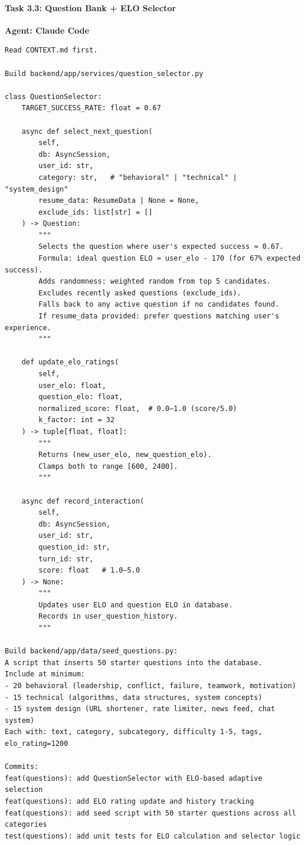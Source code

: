 \documentclass[
  11pt,
]{article}
\begin{document}
\hypertarget{task-3.3-question-bank-elo-selector}{%
\paragraph{Task 3.3: Question Bank + ELO
Selector}\label{task-3.3-question-bank-elo-selector}}

\textbf{Agent: Claude Code}

\begin{lstlisting}
Read CONTEXT.md first.

Build backend/app/services/question_selector.py

class QuestionSelector:
    TARGET_SUCCESS_RATE: float = 0.67

    async def select_next_question(
        self,
        db: AsyncSession,
        user_id: str,
        category: str,   # "behavioral" | "technical" | "system_design"
        resume_data: ResumeData | None = None,
        exclude_ids: list[str] = []
    ) -> Question:
        """
        Selects the question where user's expected success ≈ 0.67.
        Formula: ideal question ELO ≈ user_elo - 170 (for 67% expected success).
        Adds randomness: weighted random from top 5 candidates.
        Excludes recently asked questions (exclude_ids).
        Falls back to any active question if no candidates found.
        If resume_data provided: prefer questions matching user's experience.
        """

    def update_elo_ratings(
        self,
        user_elo: float,
        question_elo: float,
        normalized_score: float,  # 0.0–1.0 (score/5.0)
        k_factor: int = 32
    ) -> tuple[float, float]:
        """
        Returns (new_user_elo, new_question_elo).
        Clamps both to range [600, 2400].
        """

    async def record_interaction(
        self,
        db: AsyncSession,
        user_id: str,
        question_id: str,
        turn_id: str,
        score: float   # 1.0–5.0
    ) -> None:
        """
        Updates user ELO and question ELO in database.
        Records in user_question_history.
        """

Build backend/app/data/seed_questions.py:
A script that inserts 50 starter questions into the database.
Include at minimum:
- 20 behavioral (leadership, conflict, failure, teamwork, motivation)
- 15 technical (algorithms, data structures, system concepts)
- 15 system design (URL shortener, rate limiter, news feed, chat system)
Each with: text, category, subcategory, difficulty 1-5, tags, elo_rating=1200

Commits:
feat(questions): add QuestionSelector with ELO-based adaptive selection
feat(questions): add ELO rating update and history tracking
feat(questions): add seed script with 50 starter questions across all categories
test(questions): add unit tests for ELO calculation and selector logic
\end{lstlisting}
\end{document}
